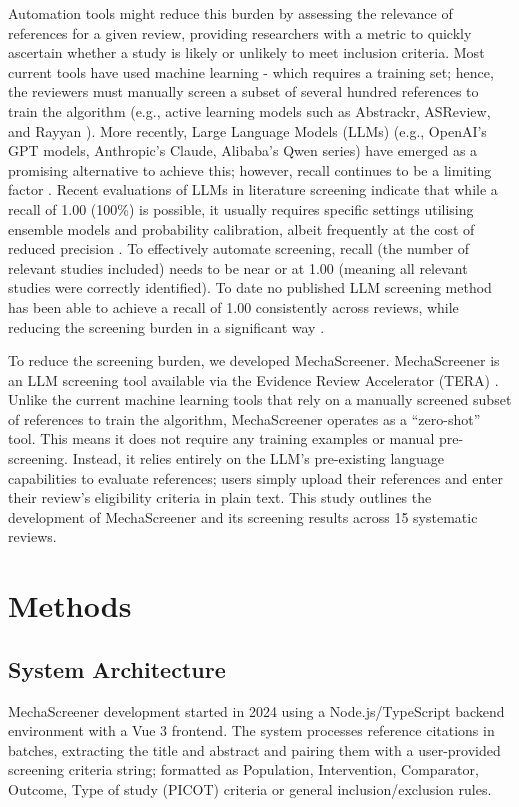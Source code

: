 \documentclass[11pt,a4paper]{article}
\begin{document}
Automation tools might reduce this burden by assessing the relevance of references for a given review, providing researchers with a metric to quickly ascertain whether a study is likely or unlikely to meet inclusion criteria. Most current tools have used machine learning - which requires a training set; hence, the reviewers must manually screen a subset of several hundred references to train the algorithm (e.g., active learning models such as Abstrackr, ASReview, and Rayyan \cite{ofori-boateng_enhancing_2024}). More recently, Large Language Models (LLMs) (e.g., OpenAI's GPT models, Anthropic's Claude, Alibaba's Qwen series) have emerged as a promising alternative to achieve this; however, recall continues to be a limiting factor \cite{delgado-chaves_transforming_2025}. Recent evaluations of LLMs in literature screening indicate that while a recall of 1.00 (100\%) is possible, it usually requires specific settings utilising ensemble models and probability calibration, albeit frequently at the cost of reduced precision \cite{sanghera_high-performance_2025}. To effectively automate screening, recall (the number of relevant studies included) needs to be near or at 1.00 (meaning all relevant studies were correctly identified). To date no published LLM screening method has been able to achieve a recall of 1.00 consistently across reviews, while reducing the screening burden in a significant way \cite{clark_generative_2025}.

To reduce the screening burden, we developed MechaScreener. MechaScreener is an LLM screening tool available via the Evidence Review Accelerator (TERA) \cite{noauthor_tera_nodate}. Unlike the current machine learning tools that rely on a manually screened subset of references to train the algorithm, MechaScreener operates as a ``zero-shot'' tool. This means it does not require any training examples or manual pre-screening. Instead, it relies entirely on the LLM's pre-existing language capabilities to evaluate references; users simply upload their references and enter their review's eligibility criteria in plain text. This study outlines the development of MechaScreener and its screening results across 15 systematic reviews.

\section{Methods}

\subsection{System Architecture}
MechaScreener development started in 2024 using a Node.js/TypeScript backend environment with a Vue 3 frontend. The system processes reference citations in batches, extracting the title and abstract and pairing them with a user-provided screening criteria string; formatted as Population, Intervention, Comparator, Outcome, Type of study (PICOT) criteria \cite{speckman_asking_2019} or general inclusion/exclusion rules.
\end{document}
